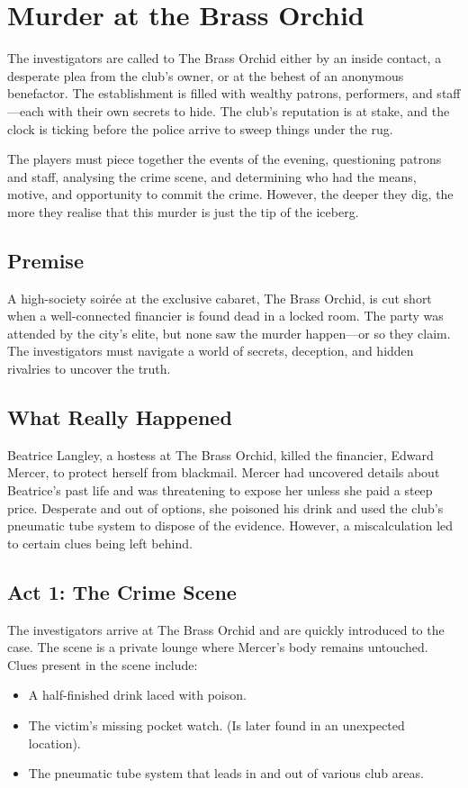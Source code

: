 \section{Murder at the Brass Orchid}



The investigators are called to The Brass Orchid either by an inside contact, a desperate plea from the club’s owner, or at the behest of an anonymous benefactor. The establishment is filled with wealthy patrons, performers, and staff—each with their own secrets to hide. The club’s reputation is at stake, and the clock is ticking before the police arrive to sweep things under the rug.

The players must piece together the events of the evening, questioning patrons and staff, analysing the crime scene, and determining who had the means, motive, and opportunity to commit the crime. However, the deeper they dig, the more they realise that this murder is just the tip of the iceberg.

\subsection{Premise} 
A high-society soirée at the exclusive cabaret, The Brass Orchid, is cut short when a well-connected financier is found dead in a locked room. The party was attended by the city's elite, but none saw the murder happen—or so they claim. The investigators must navigate a world of secrets, deception, and hidden rivalries to uncover the truth.

\subsection{What Really Happened} 
Beatrice Langley, a hostess at The Brass Orchid, killed the financier, Edward Mercer, to protect herself from blackmail. Mercer had uncovered details about Beatrice’s past life and was threatening to expose her unless she paid a steep price. Desperate and out of options, she poisoned his drink and used the club’s pneumatic tube system to dispose of the evidence. However, a miscalculation led to certain clues being left behind.

\subsection{Act 1: The Crime Scene} 
The investigators arrive at The Brass Orchid and are quickly introduced to the case. The scene is a private lounge where Mercer’s body remains untouched. Clues present in the scene include:
\begin{DndReadAloud}{}
	\begin{itemize}
		\item A half-finished drink laced with poison.
		\item The victim’s missing pocket watch. (Is later found in an unexpected location).
		\item The pneumatic tube system that leads in and out of various club areas.
	\end{itemize}
\end{DndReadAloud}

